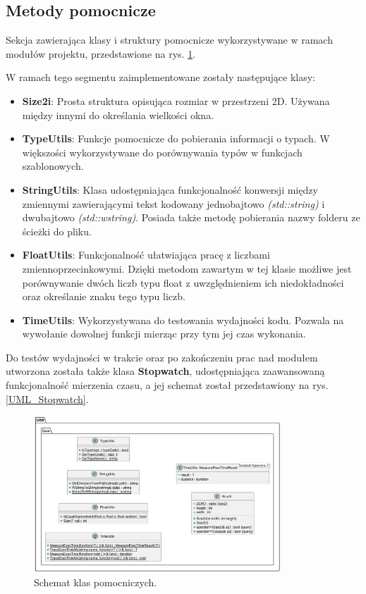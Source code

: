 	
\subsection{Metody pomocnicze}
	Sekcja zawierająca klasy i struktury pomocnicze wykorzystywane w ramach modułów projektu, przedstawione na rys. \ref{UML_Utils}.
	
	W ramach tego segmentu zaimplementowane zostały następujące klasy:
	\begin{itemize}
		\item \textbf{Size2i}: Prosta struktura opisująca rozmiar w przestrzeni 2D. Używana między innymi do określania wielkości okna.
		\item \textbf{TypeUtils}: Funkcje pomocnicze do pobierania informacji o typach. W większości wykorzystywane do porównywania typów w funkcjach szablonowych.
		\item \textbf{StringUtils}: Klasa udostępniająca funkcjonalność konwersji między zmiennymi zawierającymi tekst kodowany jednobajtowo \textit{(std::string)} i dwubajtowo \textit{(std::wstring)}. Posiada także metodę pobierania nazwy folderu ze ścieżki do pliku.
		\item \textbf{FloatUtils}: Funkcjonalność ułatwiająca pracę z liczbami zmiennoprzecinkowymi. Dzięki metodom zawartym w tej klasie możliwe jest porównywanie dwóch liczb typu float z uwzględnieniem ich niedokładności oraz określanie znaku tego typu liczb.
		\item \textbf{TimeUtils}: Wykorzystywana do testowania wydajności kodu. Pozwala na wywołanie dowolnej funkcji mierząc przy tym jej czas wykonania.
	\end{itemize}

	Do testów wydajności w trakcie oraz po zakończeniu prac nad modułem utworzona została także klasa \textbf{Stopwatch}, udostępniająca zaawansowaną funkcjonalność mierzenia czasu, a jej schemat został przedstawiony na rys. \ref{UML_Stopwatch}.
	
	\vfill
	\clearpage
	
	\begin{figure}[h!]
		\centering
		\includegraphics[width=350px]{images/UML/utils.png}
		\caption{Schemat klas pomocniczych.}
		\label{UML_Utils}
	\end{figure}
	
